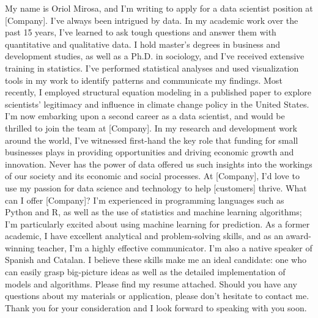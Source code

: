 \cvletter{}

\cvparagraph{}
  {My name is Oriol Mirosa, and I’m writing to apply for a data scientist position at [Company].}
\cvparagraph{}
  {I’ve always been intrigued by data. In my academic work over the past 15 years, I’ve learned to ask tough questions and answer them with quantitative and qualitative data. I hold master’s degrees in business and development studies, as well as a Ph.D. in sociology, and I’ve received extensive training in statistics. I’ve performed statistical analyses and used visualization tools in my work to identify patterns and communicate my findings. Most recently, I employed structural equation modeling in a published paper to explore scientists' legitimacy and influence in climate change policy in the United States.}
\cvparagraph{}
  {I’m now embarking upon a second career as a data scientist, and would be thrilled to join the team at [Company]. In my research and development work around the world, I’ve witnessed first-hand the key role that funding for small businesses plays in providing opportunities and driving economic growth and innovation. Never has the power of data offered us such insights into the workings of our society and its economic and social processes. At [Company], I’d love to use my passion for data science and technology to help [customers] thrive.}
\cvparagraph{}
  {What can I offer [Company]? I’m experienced in programming languages such as Python and R, as well as the use of statistics and machine learning algorithms; I’m particularly excited about using machine learning for prediction. As a former academic, I have excellent analytical and problem-solving skills, and as an award-winning teacher, I’m a highly effective communicator. I’m also a native speaker of Spanish and Catalan. I believe these skills make me an ideal candidate: one who can easily grasp big-picture ideas as well as the detailed implementation of models and algorithms.}
\cvparagraph{}
  {Please find my resume attached. Should you have any questions about my materials or application, please don’t hesitate to contact me.}
\cvparagraph{}
  {Thank you for your consideration and I look forward to speaking with you soon.}